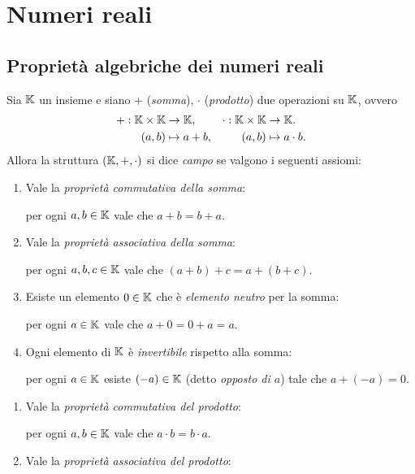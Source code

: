 \section{Numeri reali}

\subsection{Proprietà algebriche dei numeri reali}

\begin{definition} [Campo]
    \label{def:campo}
    Sia $\mathbb{K}$ un insieme e siano $+$ (\emph{somma}), $\cdot$ (\emph{prodotto}) due operazioni su $\mathbb{K}$, ovvero \begin{align*}
        + : \mathbb{K} \times \mathbb{K} &\to \mathbb{K}, & \cdot : \mathbb{K} \times \mathbb{K} &\to \mathbb{K}. \\
        (a, b) &\mapsto a+b,      &             (a, b) &\mapsto a\cdot b.
    \end{align*} Allora la struttura $(\mathbb{K}, +, \cdot)$ si dice \emph{campo} se valgono i seguenti assiomi:
    \begin{enumerate}[label={(S\arabic*)}]
        \item \label{def:campo_sum:com} Vale la \emph{proprietà commutativa della somma}:
        
        per ogni $a, b \in \mathbb{K}$ vale che $a + b = b + a$.
        \item \label{def:campo_sum:ass} Vale la \emph{proprietà associativa della somma}:
        
        per ogni $a, b, c \in \mathbb{K}$ vale che $(a + b) + c = a + (b + c)$.
        \item \label{def:campo_sum:neu} Esiste un elemento $0 \in \mathbb{K}$ che è \emph{elemento neutro} per la somma:
        
        per ogni $a \in \mathbb{K}$ vale che $a + 0 = 0 + a = a$.
        \item \label{def:campo_sum:opp} Ogni elemento di $\mathbb{K}$ è \emph{invertibile} rispetto alla somma:
        
        per ogni $a \in \mathbb{K}$ esiste $(-a) \in \mathbb{K}$ (detto \emph{opposto di $a$}) tale che $a + (-a) = 0$.
    \end{enumerate}
    \begin{enumerate}[label={(P\arabic*)}]
        \item \label{def:campo_prod:com} Vale la \emph{proprietà commutativa del prodotto}:
        
        per ogni $a, b \in \mathbb{K}$ vale che $a \cdot b = b \cdot a$.
        \item \label{def:campo_prod:ass} Vale la \emph{proprietà associativa del prodotto}:
        

\end{enumerate}
\end{definition}
